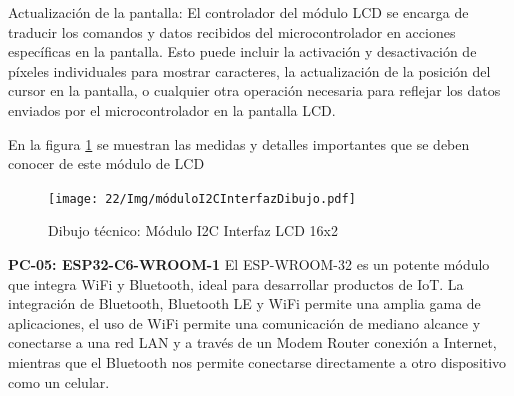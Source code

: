     Actualización de la pantalla: El controlador del módulo LCD se encarga de traducir los comandos y datos recibidos del microcontrolador en acciones específicas en la pantalla. Esto puede incluir la activación y desactivación de píxeles individuales para mostrar caracteres, la actualización de la posición del cursor en la pantalla, o cualquier otra operación necesaria para reflejar los datos enviados por el microcontrolador en la pantalla LCD.
    
    En la figura \ref{fig:modulo} se muestran las medidas y detalles importantes que se deben conocer de este módulo de LCD
    \begin{figure}[H]
        \centering
        \texttt{[image: 22/Img/móduloI2CInterfazDibujo.pdf]}
        \caption{Dibujo técnico: Módulo I2C Interfaz LCD 16x2}
        \label{fig:modulo}
    \end{figure}
    
    
    \textbf{PC-05: ESP32-C6-WROOM-1 }
    El ESP-WROOM-32 es un potente módulo que integra WiFi y Bluetooth, ideal para desarrollar productos de IoT.  La integración de Bluetooth, Bluetooth LE y WiFi permite una amplia gama de aplicaciones, el uso de WiFi permite una comunicación de mediano alcance y conectarse a una red LAN y a través de un Modem Router conexión a Internet, mientras que el Bluetooth nos permite conectarse directamente a otro dispositivo como un celular.
    
